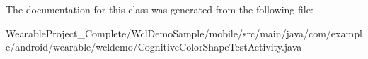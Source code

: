 The documentation for this class was generated from the following file\+:\begin{DoxyCompactItemize}
\item 
Wearable\+Project\+\_\+\+Complete/\+Wcl\+Demo\+Sample/mobile/src/main/java/com/example/android/wearable/wcldemo/Cognitive\+Color\+Shape\+Test\+Activity.\+java\end{DoxyCompactItemize}
